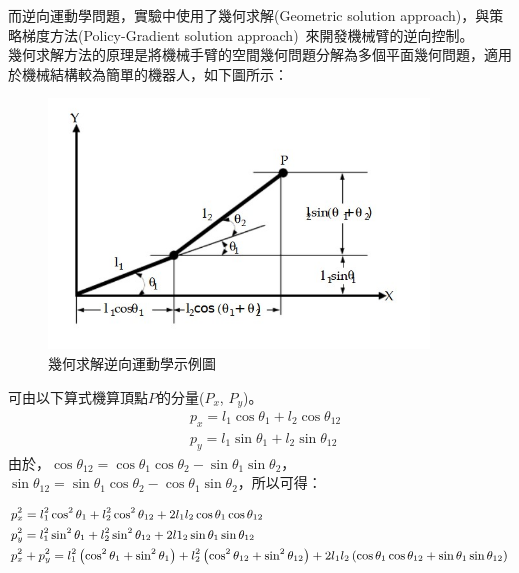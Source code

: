 \documentclass[class=NCU_thesis, crop=false]{standalone}
\begin{document}
而逆向運動學問題，實驗中使用了幾何求解(Geometric solution approach)，與策略梯度方法(Policy-Gradient solution approach)~\cite{dauce2010inverse}來開發機械臂的逆向控制。\\

幾何求解方法的原理是將機械手臂的空間幾何問題分解為多個平面幾何問題，適用於機械結構較為簡單的機器人，如下圖所示：

\begin{figure}[htbp]
    \centering
    \includegraphics[width=0.9\textwidth]{figures/IK.jpg}
\caption{幾何求解逆向運動學示例圖}
\end{figure}

可由以下算式機算頂點$P$的分量($P_{x}$, $P_{y}$)。
$$
\begin{aligned}
& p_{x}=l_1 \cos \theta_1+l_2 \cos \theta_{12} \\
& p_{y}=l_1 \sin \theta_1+l_2 \sin \theta_{12}
\end{aligned}
$$
由於，$\cos \theta_{12}=\cos \theta_{1} \cos \theta_{2}-\sin \theta_{1} \sin \theta_{2}$，$
\sin \theta_{12}=\sin \theta_{1} \cos \theta_{2}-\cos \theta_{1} \sin \theta_{2}$，所以可得：

$$
\begin{small}
\begin{aligned}
& p_{x}^2=l_1^2 \cos^2 \theta_1+l_2^2 \cos^2 \theta_{12}+2 l_1 l_2 \cos \theta_1 \cos \theta_{12} \\
& p_{y}^2=l_1^2 \sin^2 \theta_1 + l_2^2 \sin^2 \theta_{12}+2 l1_2 \sin \theta_1 \sin \theta_{12} \\
& p_{x}^2+p_{y}^2=l_1^2\left(\cos^2 \theta_1+\sin^2 \theta_1\right)+l_2^2\left(\cos^2 \theta_{12}+\sin^2 \theta_{12}\right)+2l_1 l_2\left(\cos \theta_1 \cos \theta_{12}+\sin \theta_1 \sin \theta_{12}\right)
\end{aligned}
\end{small}
$$
\end{document}
